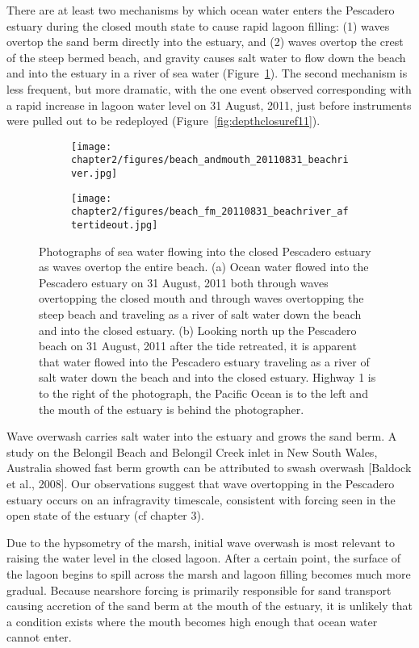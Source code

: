 There are at least two mechanisms by which ocean water enters the Pescadero estuary during the closed mouth state to cause rapid lagoon filling: (1) waves overtop the sand berm directly into the estuary, and (2) waves overtop the crest of the steep bermed beach, and gravity causes salt water to flow down the beach and into the estuary in a river of sea water (Figure~\ref{fig:beachriver}). The second mechanism is less frequent, but more dramatic, with the one event observed corresponding with a rapid increase in lagoon water level on 31 August, 2011, just before instruments were pulled out to be redeployed (Figure~\ref{fig:depthclosuref11}).

\begin{figure}
\begin{subfigure}{.5\textwidth}
		\texttt{[image: chapter2/figures/beach\_andmouth\_20110831\_beachriver.jpg]}
\end{subfigure}
\begin{subfigure}{.5\textwidth}
		\texttt{[image: chapter2/figures/beach\_fm\_20110831\_beachriver\_aftertideout.jpg]}
\end{subfigure}   \caption{Photographs of sea water flowing into the closed Pescadero estuary as waves overtop the entire beach. (a) Ocean water flowed into the Pescadero estuary on 31 August, 2011 both through waves overtopping the closed mouth and through waves overtopping the steep beach and traveling as a river of salt water down the beach and into the closed estuary. (b) Looking north up the Pescadero beach on 31 August, 2011 after the tide retreated, it is apparent that water flowed into the Pescadero estuary traveling as a river of salt water down the beach and into the closed estuary. Highway 1 is to the right of the photograph, the Pacific Ocean is to the left and the mouth of the estuary is behind the photographer.} 		 \label{fig:beachriver} 
 \end{figure}

Wave overwash carries salt water into the estuary and grows the sand berm. A study on the Belongil Beach and Belongil Creek inlet in New South Wales, Australia showed fast berm growth can be attributed to swash overwash [Baldock et al., 2008]. Our observations suggest that wave overtopping in the Pescadero estuary occurs on an infragravity timescale, consistent with forcing seen in the open state of the estuary (cf chapter 3).

Due to the hypsometry of the marsh, initial wave overwash is most relevant to raising the water level in the closed lagoon. After a certain point, the surface of the lagoon begins to spill across the marsh and lagoon filling becomes much more gradual. Because nearshore forcing is primarily responsible for sand transport causing accretion of the sand berm at the mouth of the estuary, it is unlikely that a condition exists where the mouth becomes high enough that ocean water cannot enter. 


